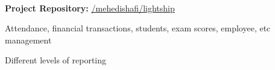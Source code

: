  \\

\vspace{\topsep}
{\bf Project Repository: }\href{https://github.com/mehedi-shafi/lightship}{\github/mehedishafi/lightship}
\vspace{\topsep}

\begin{tightitemize}

\item Attendance, financial transactions, students, exam scores, employee, etc management
\item Different levels of reporting

\end{tightitemize}

\sectionspace
